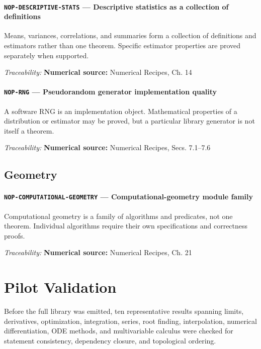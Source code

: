 \documentclass[10pt]{article}
\newcommand{\pidraw}[1]{\begingroup\urlstyle{tt}\nolinkurl{#1}\endgroup}
\theoremstyle{definition}
\theoremstyle{remark}
\begin{document}
\label{prf:NOP-DESCRIPTIVE-STATS}

\paragraph{\pidraw{NOP-DESCRIPTIVE-STATS} --- Descriptive statistics as a collection of definitions}

Means, variances, correlations, and summaries form a collection of definitions and estimators rather than one theorem. Specific estimator properties are proved separately when supported.

\smallskip\noindent\textit{Traceability:} \textbf{Numerical source:} Numerical Recipes, Ch. 14\par

\label{prf:NOP-RNG}

\paragraph{\pidraw{NOP-RNG} --- Pseudorandom generator implementation quality}

A software RNG is an implementation object. Mathematical properties of a distribution or estimator may be proved, but a particular library generator is not itself a theorem.

\smallskip\noindent\textit{Traceability:} \textbf{Numerical source:} Numerical Recipes, Secs. 7.1--7.6\par

\subsection{Geometry}

\label{prf:NOP-COMPUTATIONAL-GEOMETRY}

\paragraph{\pidraw{NOP-COMPUTATIONAL-GEOMETRY} --- Computational-geometry module family}

Computational geometry is a family of algorithms and predicates, not one theorem. Individual algorithms require their own specifications and correctness proofs.

\smallskip\noindent\textit{Traceability:} \textbf{Numerical source:} Numerical Recipes, Ch. 21\par
\section{Pilot Validation}
Before the full library was emitted, ten representative results spanning limits, derivatives,
optimization, integration, series, root finding, interpolation, numerical differentiation, ODE
methods, and multivariable calculus were checked for statement consistency, dependency closure, and
topological ordering.
\end{document}
